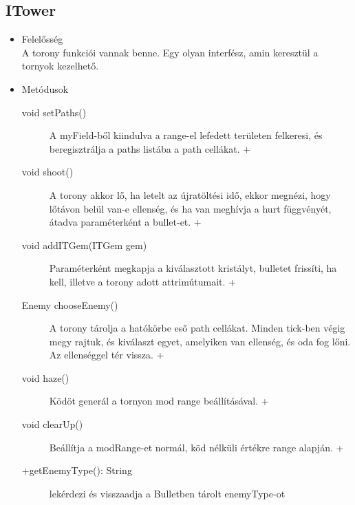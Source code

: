 \subsection{ITower}
\begin{itemize}
\item Felelősség\\
A torony funkciói vannak benne. Egy olyan interfész, amin keresztül a tornyok kezelhető.
\item Metódusok\\
	\begin{description}
		\item[void setPaths()] A myField-ből kiindulva a range-el lefedett területen felkeresi, és beregisztrálja a paths listába a path cellákat. +
\item[void shoot()] A torony akkor lő, ha letelt az újratöltési idő, ekkor megnézi, hogy lőtávon belül van-e ellenség, és ha van meghívja a hurt függvényét, átadva paraméterként a bullet-et. +
\item[void addITGem(ITGem gem)] Paraméterként megkapja a kiválasztott kristályt, bulletet frissíti, ha kell, illetve a torony adott attrimútumait. +
\item[Enemy chooseEnemy()] A torony tárolja a hatókörbe eső path cellákat. Minden tick-ben végig megy rajtuk, és kiválaszt egyet, amelyiken van ellenség, és oda fog lőni. Az ellenséggel tér vissza. +
\item[void haze()] Ködöt generál a tornyon mod range beállításával. +
\item[void clearUp()] Beállítja a modRange-et normál, köd nélküli értékre range alapján. +
\item[+getEnemyType(): String] lekérdezi és visszaadja a Bulletben tárolt enemyType-ot

		
		
	\end{description}
\end{itemize}
